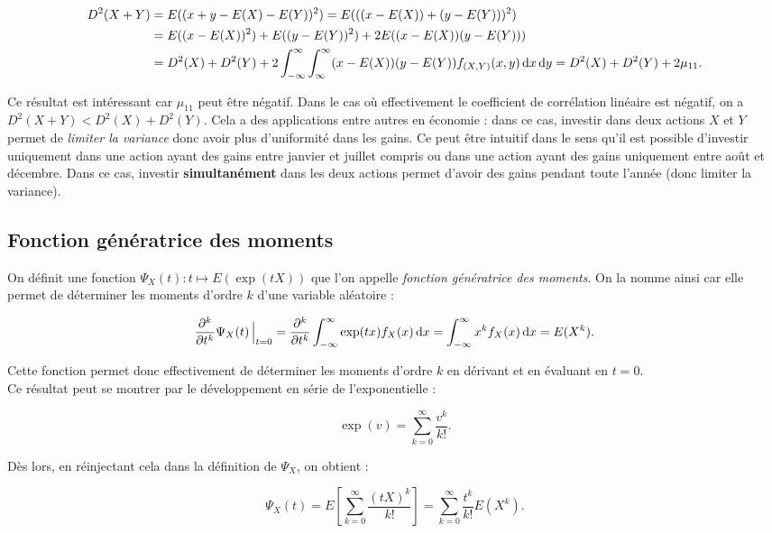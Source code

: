 \documentclass{article}
\begin{document}
			\[\begin{aligned}
				D^2(X+Y) &= E((x+y-E(X)-E(Y))^2) = E(((x-E(X)) + (y-E(Y)))^2) \\
						 &= E((x-E(X))^2) + E((y-E(Y))^2) + 2E((x-E(X))(y-E(Y))) \\
						 &= D^2(X) + D^2(Y) + 2\int_{-\infty}^\infty\int_{\-\infty}^\infty(x-E(X))(y-E(Y))f_{(X, Y)}(x, y)\dif x\dif y = D^2(X) + D^2(Y) + 2\mu_{11}.
			\end{aligned}\]

			Ce résultat est intéressant car $\mu_{11}$ peut être négatif. Dans le cas où effectivement le coefficient de corrélation linéaire est négatif, on a
			$D^2(X+Y) < D^2(X)+D^2(Y)$. Cela a des applications entre autres en économie : dans ce cas, investir dans deux actions $X$ et $Y$ permet de
			\textit{limiter la variance} donc avoir plus d'uniformité dans les gains. Ce peut être intuitif dans le sens qu'il est possible d'investir uniquement dans une
			action ayant des gains entre janvier et juillet compris ou dans une action ayant des gains uniquement entre août et décembre. Dans ce cas, investir
			\textbf{simultanément} dans les deux actions permet d'avoir des gains pendant toute l'année (donc limiter la variance).

	\subsection{Fonction génératrice des moments}
		On définit une fonction $\Psi_X(t) : t \mapsto E(\exp(tX))$ que l'on appelle \textit{fonction génératrice des moments}. On la nomme ainsi car elle permet de déterminer
		les moments d'ordre $k$ d'une variable aléatoire :

		\[\frac {\partial^k}{\partial t^k}\Psi_X(t)\sVert[2] _{t=0} = \frac {\partial^k}{\partial t^k}\int_{-\infty}^\infty\exp(tx)f_X(x)\dif x = \int_{-\infty}^\infty x^kf_X(x)\dif x = E(X^k).\]

		Cette fonction permet donc effectivement de déterminer les moments d'ordre $k$ en dérivant et en évaluant en $t = 0$. \\
		Ce résultat peut se montrer par le développement en série de l'exponentielle :

		\[\exp(v) = \sum_{k=0}^\infty\frac {v^k}{k!}.\]

		Dès lors, en réinjectant cela dans la définition de $\Psi_X$, on obtient :

		\[\Psi_X(t) = E\left[\sum_{k=0}^\infty\frac {(tX)^k}{k!}\right] = \sum_{k=0}^\infty\frac {t^k}{k!}E(X^k).\]
\end{document}
